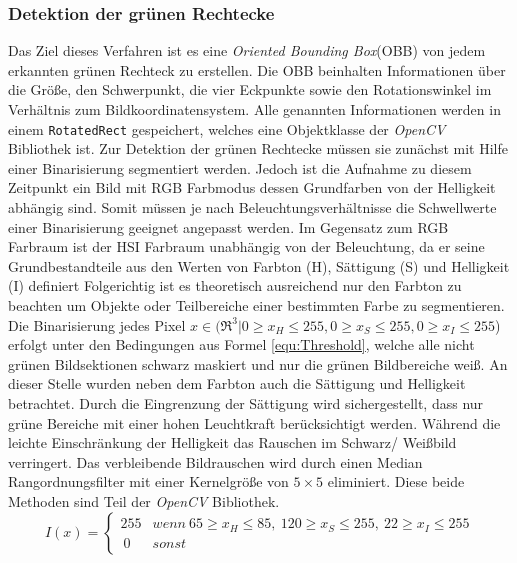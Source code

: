 \subsubsection{Detektion der grünen Rechtecke}\label{sec:GreenRects}
Das Ziel dieses Verfahren ist es eine \textit{Oriented Bounding Box}(OBB) von jedem erkannten grünen Rechteck zu erstellen. Die OBB beinhalten Informationen über die Größe, den Schwerpunkt, die vier Eckpunkte sowie den Rotationswinkel im Verhältnis zum Bildkoordinatensystem. Alle genannten Informationen werden in einem \texttt{RotatedRect} gespeichert, welches eine Objektklasse der \textit{OpenCV} Bibliothek ist.
Zur Detektion der grünen Rechtecke müssen sie zunächst mit Hilfe einer Binarisierung segmentiert werden. Jedoch ist die Aufnahme zu diesem Zeitpunkt ein Bild mit RGB Farbmodus dessen Grundfarben von der Helligkeit abhängig sind. Somit müssen je nach Beleuchtungsverhältnisse die Schwellwerte einer Binarisierung geeignet angepasst werden. Im Gegensatz zum RGB Farbraum ist der HSI Farbraum unabhängig von der Beleuchtung, da er seine Grundbestandteile aus den Werten von Farbton (H), Sättigung (S) und Helligkeit (I) definiert Folgerichtig ist es theoretisch ausreichend nur den Farbton zu beachten um Objekte oder Teilbereiche einer bestimmten Farbe zu segmentieren.
Die Binarisierung jedes Pixel $x \in (\Re^3 | 0 \ge x_H \le 255, 0 \ge x_S \le 255, 0 \ge x_I \le 255$) erfolgt unter den Bedingungen aus Formel \ref{equ:Threshold}, welche alle nicht grünen Bildsektionen schwarz maskiert und nur die grünen Bildbereiche weiß. An dieser Stelle wurden neben dem Farbton auch die Sättigung und Helligkeit betrachtet. Durch die Eingrenzung der Sättigung wird sichergestellt, dass nur grüne Bereiche mit einer hohen Leuchtkraft berücksichtigt werden. Während die leichte Einschränkung der Helligkeit das Rauschen im Schwarz/ Weißbild verringert. Das verbleibende Bildrauschen wird durch einen Median Rangordnungsfilter mit einer Kernelgröße von $5\times5$ eliminiert. Diese beide Methoden sind Teil der \textit{OpenCV} Bibliothek.
\begin{equation}
\label{equ:Threshold}
I(x) = \begin{cases}
255 & wenn \ 65 \ge x_H \le 85, \ 120 \ge x_S \le 255, \ 22 \ge x_I \le 255\\\
0 & sonst
\end{cases}
\end{equation}

